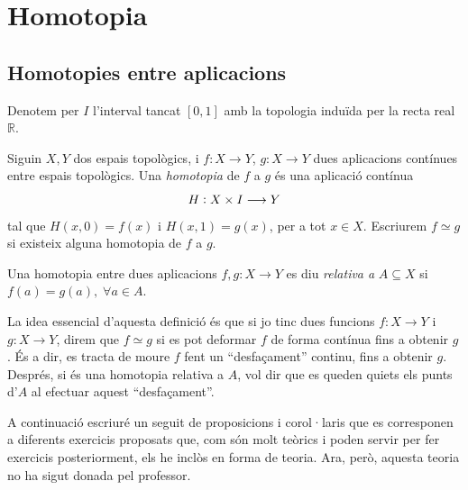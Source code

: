 \documentclass[../main.tex]{subfiles}
\begin{document}
\chapter{Homotopia}

\section{Homotopies entre aplicacions}

Denotem per $I$ l'interval tancat $[0,1]$ amb la topologia induïda per la recta real $\mathbb{R}$.

\begin{defi}
[Homotopia]\label{def:homotopia} Siguin $X,Y$ dos espais topològics, i $f:X\rightarrow Y$, $g:X\rightarrow Y$ dues aplicacions contínues entre espais topològics. Una \textit{homotopia} de $f$ a $g$ és una aplicació contínua
\begin{equation}
    \notag
    H:X\times I \longrightarrow Y
\end{equation}
tal que $H(x,0) = f(x)$ i $H(x,1) = g(x)$, per a tot $x\in X$. Escriurem $f\simeq g$ si existeix alguna homotopia de $f$ a $g$. 
\end{defi}

\begin{defi}
\label{def:homotopiarelativaaconjunt} Una homotopia entre dues aplicacions $f,g:X\rightarrow Y$ es diu \textit{relativa a} $A\subseteq X$ si $f(a) = g(a),\;\forall a\in A$.
\end{defi}

La idea essencial d'aquesta definició és que si jo tinc dues funcions $f:X\rightarrow Y$ i $g:X\rightarrow Y$, direm que $f\simeq g$ si es pot deformar $f$ de forma contínua fins a obtenir $g$. És a dir, es tracta de moure $f$ fent un ``desfaçament'' continu, fins a obtenir $g$. Després, si és una homotopia relativa a $A$, vol dir que es queden quiets els punts d'$A$ al efectuar aquest ``desfaçament''.

A continuació escriuré un seguit de proposicions i corol·laris que es corresponen a diferents exercicis proposats que, com són molt teòrics i poden servir per fer exercicis posteriorment, els he inclòs en forma de teoria. Ara, però, aquesta teoria no ha sigut donada pel professor.
\end{document}
